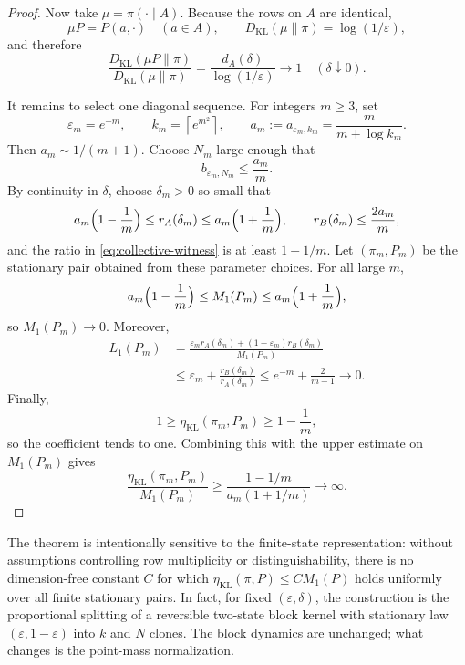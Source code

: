 \documentclass[11pt]{article}
\newcommand{\KL}{D_{\mathrm{KL}}}
\newcommand{\etaKL}{\eta_{\mathrm{KL}}}
\newcommand{\Mone}{M_1}
\newcommand{\Lone}{L_1}
\begin{document}
\begin{proof}
Now take \(\mu=\pi(\cdot\mid A)\).  Because the rows on \(A\) are
identical,
\[
  \mu P=P(a,\cdot)\quad(a\in A),
  \qquad
  \KL(\mu\|\pi)=\log(1/\varepsilon),
\]
and therefore
\begin{equation}
  \frac{\KL(\mu P\|\pi)}{\KL(\mu\|\pi)}
  =\frac{d_A(\delta)}{\log(1/\varepsilon)}
  \longrightarrow1
  \quad(\delta\downarrow0).
  \label{eq:collective-witness}
\end{equation}

It remains to select one diagonal sequence.  For integers \(m\ge3\), set
\[
  \varepsilon_m=e^{-m},
  \qquad
  k_m=\left\lceil e^{m^2}\right\rceil,
  \qquad
  a_m:=a_{\varepsilon_m,k_m}
  =\frac{m}{m+\log k_m}.
\]
Then \(a_m\sim1/(m+1)\).  Choose \(N_m\) large enough that
\[
  b_{\varepsilon_m,N_m}\le\frac{a_m}{m}.
\]
By continuity in \(\delta\), choose \(\delta_m>0\) so small that
\[
  a_m\Bigl(1-\frac1m\Bigr)
  \le r_A(\delta_m)
  \le a_m\Bigl(1+\frac1m\Bigr),
  \qquad
  r_B(\delta_m)\le\frac{2a_m}{m},
\]
and the ratio in \eqref{eq:collective-witness} is at least \(1-1/m\).
Let \((\pi_m,P_m)\) be the stationary pair obtained from these parameter
choices.  For all large \(m\),
\[
  a_m\Bigl(1-\frac1m\Bigr)
  \le\Mone(P_m)
  \le a_m\Bigl(1+\frac1m\Bigr),
\]
so \(\Mone(P_m)\to0\).  Moreover,
\begin{align*}
  \Lone(P_m)
  &=
  \frac{\varepsilon_m r_A(\delta_m)
        +(1-\varepsilon_m)r_B(\delta_m)}
       {\Mone(P_m)}\\
  &\le
  \varepsilon_m+
  \frac{r_B(\delta_m)}{r_A(\delta_m)}
  \le
  e^{-m}+\frac{2}{m-1}
  \longrightarrow0.
\end{align*}
Finally,
\[
  1\ge\etaKL(\pi_m,P_m)\ge1-\frac1m,
\]
so the coefficient tends to one.  Combining this with the upper estimate
on \(\Mone(P_m)\) gives
\[
  \frac{\etaKL(\pi_m,P_m)}{\Mone(P_m)}
  \ge
  \frac{1-1/m}{a_m(1+1/m)}
  \longrightarrow\infty.
\]
\end{proof}

The theorem is intentionally sensitive to the finite-state representation:
without assumptions controlling row multiplicity or distinguishability,
there is no dimension-free constant \(C\) for which
\(\etaKL(\pi,P)\le C\Mone(P)\) holds uniformly over all finite stationary
pairs.  In fact, for fixed \((\varepsilon,\delta)\), the construction is the
proportional splitting of a reversible two-state block kernel with stationary
law \((\varepsilon,1-\varepsilon)\) into \(k\) and \(N\) clones.  The block
dynamics are unchanged; what changes is the point-mass normalization.
\end{document}
